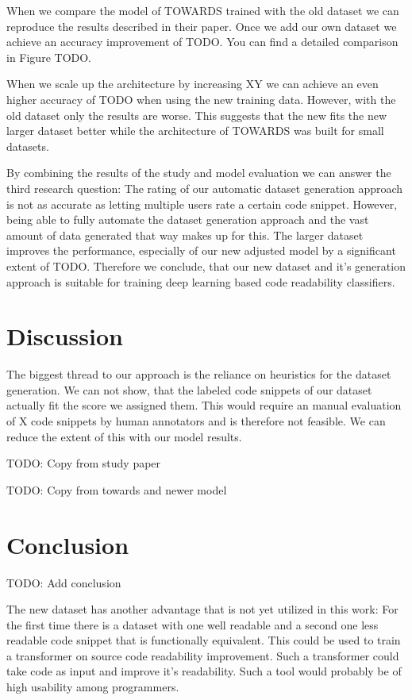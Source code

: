 \documentclass[%
class=scrreprt,
chapterprefix=false,%
open=right,%
twoside=false,%
paper=a4,%
logofile={Logo\_zentral\_farbig\_EN.png},%
thesistype=master,%
UKenglish,%
]{se2thesis}
\begin{document}
	When we compare the model of TOWARDS trained with the old dataset we can reproduce the results described in their paper. Once we add our own dataset we achieve an accuracy improvement of TODO. You can find a detailed comparison in Figure TODO.
	
	When we scale up the architecture by increasing XY we can achieve an even higher accuracy of TODO when using the new training data. However, with the old dataset only the results are worse. This suggests that the new fits the new larger dataset better while the architecture of TOWARDS was built for small datasets.
	
	By combining the results of the study and model evaluation we can answer the third research question: The rating of our automatic dataset generation approach is not as accurate as letting multiple users rate a certain code snippet. However, being able to fully automate the dataset generation approach and the vast amount of data generated that way makes up for this. The larger dataset improves the performance, especially of our new adjusted model by a significant extent of TODO. Therefore we conclude, that our new dataset and it's generation approach is suitable for training deep learning based code readability classifiers.
	
	\section{Discussion} \label{Discussion}
	The biggest thread to our approach is the reliance on heuristics for the dataset generation. We can not show, that the labeled code snippets of our dataset actually fit the score we assigned them. This would require an manual evaluation of X code snippets by human annotators and is therefore not feasible. We can reduce the extent of this with our model results. 
	
	TODO: Copy from study paper
	
	TODO: Copy from towards and newer model
		
	
	\section{Conclusion} \label{Conclusion}
	TODO: Add conclusion
	
	The new dataset has another advantage that is not yet utilized in this work: For the first time there is a dataset with one well readable and a second one less readable code snippet that is functionally equivalent. This could be used to train a transformer on source code readability improvement. Such a transformer could take code as input and improve it's readability. Such a tool would probably be of high usability among programmers.
	
\end{document}
